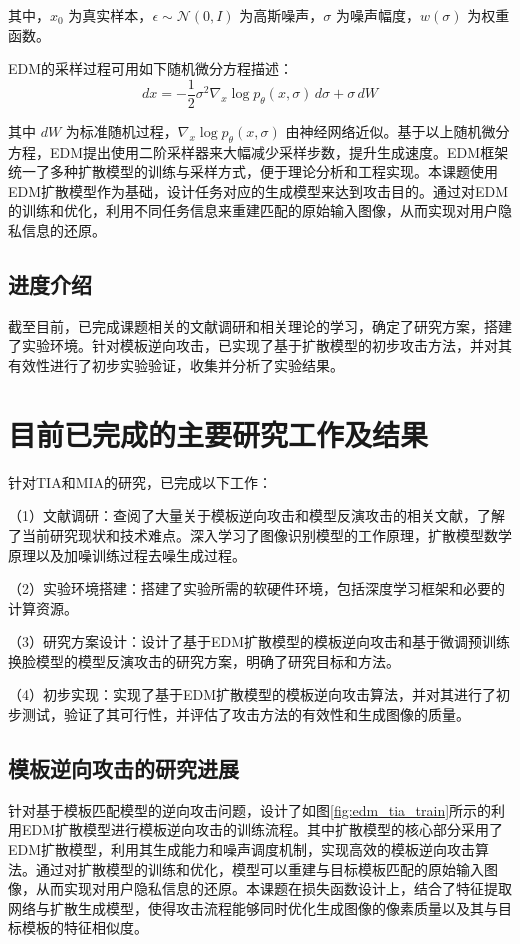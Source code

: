 其中，$x_0$ 为真实样本，$\epsilon \sim \mathcal{N}(0, I)$ 为高斯噪声，$\sigma$ 为噪声幅度，$w(\sigma)$ 为权重函数。


EDM的采样过程可用如下随机微分方程描述：
\begin{equation}
  dx = -\frac{1}{2} \sigma^2 \nabla_x \log p_\theta(x, \sigma) \, d\sigma + \sigma \, dW
\end{equation}

其中 $dW$ 为标准随机过程，$\nabla_x \log p_\theta(x, \sigma)$ 由神经网络近似。基于以上随机微分方程，EDM提出使用二阶采样器来大幅减少采样步数，提升生成速度。EDM框架统一了多种扩散模型的训练与采样方式，便于理论分析和工程实现。本课题使用EDM扩散模型作为基础，设计任务对应的生成模型来达到攻击目的。通过对EDM的训练和优化，利用不同任务信息来重建匹配的原始输入图像，从而实现对用户隐私信息的还原。

\subsection{进度介绍}
截至目前，已完成课题相关的文献调研和相关理论的学习，确定了研究方案，搭建了实验环境。针对模板逆向攻击，已实现了基于扩散模型的初步攻击方法，并对其有效性进行了初步实验验证，收集并分析了实验结果。

\section{目前已完成的主要研究工作及结果}

针对TIA和MIA的研究，已完成以下工作：

（1）文献调研：查阅了大量关于模板逆向攻击和模型反演攻击的相关文献，了解了当前研究现状和技术难点。深入学习了图像识别模型的工作原理，扩散模型数学原理以及加噪训练过程去噪生成过程。

（2）实验环境搭建：搭建了实验所需的软硬件环境，包括深度学习框架和必要的计算资源。

（3）研究方案设计：设计了基于EDM扩散模型的模板逆向攻击和基于微调预训练换脸模型的模型反演攻击的研究方案，明确了研究目标和方法。

（4）初步实现：实现了基于EDM扩散模型的模板逆向攻击算法，并对其进行了初步测试，验证了其可行性，并评估了攻击方法的有效性和生成图像的质量。

\subsection{模板逆向攻击的研究进展}
针对基于模板匹配模型的逆向攻击问题，设计了如图\ref{fig:edm_tia_train}所示的利用EDM扩散模型进行模板逆向攻击的训练流程。其中扩散模型的核心部分采用了EDM扩散模型，利用其生成能力和噪声调度机制，实现高效的模板逆向攻击算法。通过对扩散模型的训练和优化，模型可以重建与目标模板匹配的原始输入图像，从而实现对用户隐私信息的还原。本课题在损失函数设计上，结合了特征提取网络与扩散生成模型，使得攻击流程能够同时优化生成图像的像素质量以及其与目标模板的特征相似度。

